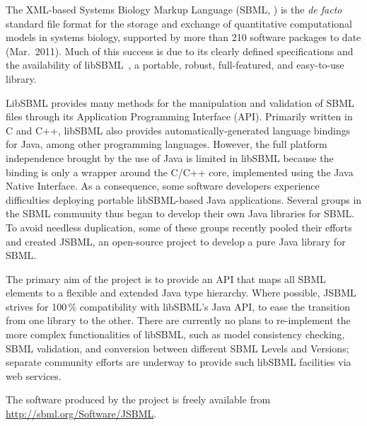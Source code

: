 \documentclass{bioinfo}
\begin{document}
The XML-based Systems Biology Markup Language (SBML, \citealt{M.Hucka03012003})
is the \emph{de facto} standard file format for the storage and exchange of
quantitative computational models in systems biology, supported by more than
210 software packages to date (Mar.~2011).
Much of this success is due to its
clearly defined specifications and the availability of libSBML~\citep{Bornstein2008},
a portable, robust, full-featured, and easy-to-use library.

LibSBML provides many methods for the manipulation and validation of
SBML files through its Application Programming Interface (API).
Primarily written in C and C++, libSBML also provides automatically-generated
language bindings for Java\texttrademark, among other programming languages.
However, the full platform independence brought by the use of Java is limited in
libSBML because the binding is only a wrapper
around the C/C++ core, implemented using the Java Native Interface.
As a consequence, some software developers experience difficulties
deploying portable libSBML-based Java applications.
Several groups in the SBML community thus began to
develop their own Java libraries for SBML. To avoid needless duplication, some of
these groups recently pooled their efforts and created JSBML, an
open-source project to develop a pure Java library for SBML.

The primary aim of the project is to provide an API 
that maps all SBML elements to a flexible and extended
Java type hierarchy. Where possible, JSBML strives for
100\,\% compatibility with libSBML's Java API, to ease the transition from
one library to the other. There are currently no plans to re-implement 
the more complex functionalities of libSBML, such as model consistency checking,
SBML validation, and conversion between different SBML Levels and Versions;
separate community efforts are underway to provide such libSBML facilities
via web services.

The software produced by the project is freely available from
\href{http://sbml.org/Software/JSBML}{http://sbml.org/Software/JSBML}.


\end{document}
